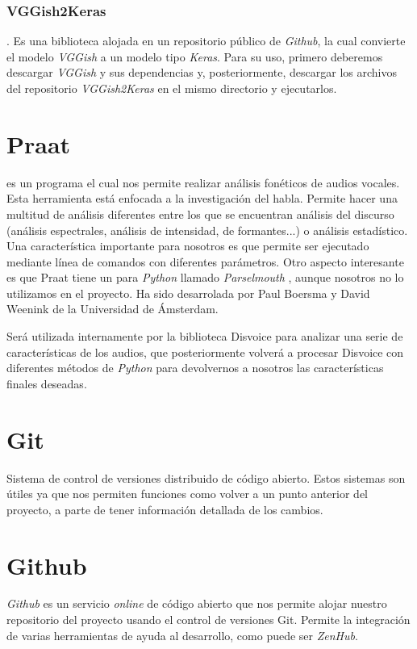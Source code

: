 \subsubsection{VGGish2Keras}
. Es una biblioteca alojada en un repositorio público de \textit{Github}, la cual convierte el modelo \textit{VGGish} a un modelo tipo \textit{Keras}. Para su uso, primero deberemos descargar \textit{VGGish} y sus dependencias y, posteriormente, descargar los archivos del repositorio \textit{VGGish2Keras} en el mismo directorio y ejecutarlos.

\section{Praat}
 \cite{praat} es un programa el cual nos permite realizar análisis fonéticos de audios vocales. Esta herramienta está enfocada a la investigación del habla. Permite hacer una multitud de análisis diferentes entre los que se encuentran análisis del discurso (análisis espectrales, análisis de intensidad, de formantes...) o análisis estadístico. Una característica importante para nosotros es que permite ser ejecutado mediante línea de comandos con diferentes parámetros. Otro aspecto interesante es que Praat tiene un  para \textit{Python} llamado \textit{Parselmouth} \cite{parselmouth}, aunque nosotros no lo utilizamos en el proyecto. Ha sido desarrolada por Paul Boersma y David Weenink de la Universidad de Ámsterdam.

Será utilizada internamente por la biblioteca Disvoice para analizar una serie de características de los audios, que posteriormente volverá a procesar Disvoice con diferentes métodos de \textit{Python} para devolvernos a nosotros las características finales deseadas.


\section{Git}
Sistema de control de versiones distribuido de código abierto. Estos sistemas son útiles ya que nos permiten funciones como volver a un punto anterior del proyecto, a parte de tener información detallada de los cambios.

\section{Github}
\textit{Github} es un servicio \textit{online} de código abierto que nos permite alojar nuestro repositorio del proyecto usando el control de versiones Git. Permite la integración de varias herramientas de ayuda al desarrollo, como puede ser \textit{ZenHub}.

